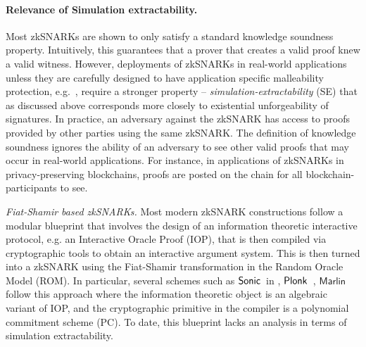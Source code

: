\paragraph{Relevance of Simulation extractability.}

Most zkSNARKs are shown to only satisfy a standard knowledge soundness property. Intuitively, this guarantees that
a prover that creates a valid proof knew a valid witness. However, deployments of zkSNARKs in real-world applications unless they are carefully designed to have application specific malleability protection, e.g.~\cite{SP:BCGGMT14}, require a stronger property -- \textit{simulation-extractability} (SE) that as discussed above corresponds more closely to existential unforgeability of signatures.
In practice, an adversary against the zkSNARK has access to proofs provided by other parties using the same
zkSNARK.  The definition of knowledge soundness ignores the ability of an adversary to see other valid proofs that may occur in real-world applications.  For instance, in applications of
zkSNARKs in privacy-preserving blockchains, proofs are posted on the chain for all
blockchain-participants to see.

\emph{Fiat-Shamir based zkSNARKs.}
Most modern zkSNARK constructions follow a modular blueprint that involves the design of an information theoretic interactive protocol, e.g. an Interactive Oracle Proof (IOP), that is then compiled via cryptographic tools to obtain an interactive argument system.  This is then turned into a zkSNARK using the Fiat-Shamir transformation in the Random Oracle Model (ROM).
In particular, several schemes such as
${\textnormal{\textsf{Sonic}}}$~in \cite{CCS:MBKM19}, $\textnormal{\textsf{Plonk}}$~\cite{EPRINT:GabWilCio19}, $\textsf{Marlin}$~\cite{EC:CHMMVW20} 
follow this approach where the information theoretic object is an algebraic variant of IOP, and the cryptographic primitive in the compiler is a polynomial commitment scheme (PC). To date, this blueprint lacks an analysis in terms of simulation extractability.



